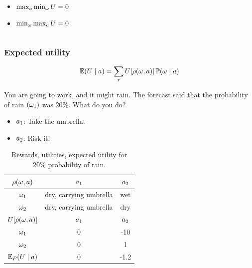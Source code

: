 \begin{frame}
\begin{example}
\begin{columns}
\begin{column}{0.5\textwidth}
        \begin{itemize}
        \item<2-> $\max_a \min_\omega U = 0$
        \item<3-> $\min_\omega \max_a U = 0$
        \end{itemize}
      \end{column}

    \end{columns}
  \end{example}
\end{frame}



\begin{frame}
  \frametitle{Expected utility}
  \[
    \mathop{\mbox{\ensuremath{\mathbb{E}}}}\nolimits (U \mid a) = \sum_r U[\rho(\omega, a)] \mathop{\mbox{\ensuremath{\mathbb{P}}}}\nolimits(\omega \mid a)
  \]
  \begin{example}%
    You are going to work, and it might rain. The forecast said that
    the probability of rain $(\omega_1)$ was $20\%$. What do you do?
    \begin{itemize}
    \item $a_1$: Take the umbrella.
    \item $a_2$: Risk it!
    \end{itemize}
    \begin{table}
      \centering
      \begin{tabular}{c|c|c}
        $\rho(\omega,a)$ & $a_1$ & $a_2$ \\ %
        \hline
        $\omega_1$ & dry, carrying umbrella & wet\\
        $\omega_2$ & dry, carrying umbrella & dry\\
        \hline
        \hline
        $U[\rho(\omega,a)]$ & $a_1$ & $a_2$ \\
        \hline
        $\omega_1$ & 0 & -10\\
        $\omega_2$ & 0 & 1\\
        \hline
        \hline
        $\mathop{\mbox{\ensuremath{\mathbb{E}}}}\nolimits_P(U \mid a)$ & 0 &  -1.2 \\ 
      \end{tabular}
      \caption{Rewards, utilities, expected utility for $20\%$ probability of rain.}
      \label{tab:rain-utility-function}
    \end{table}
  \end{example}
\end{frame}





